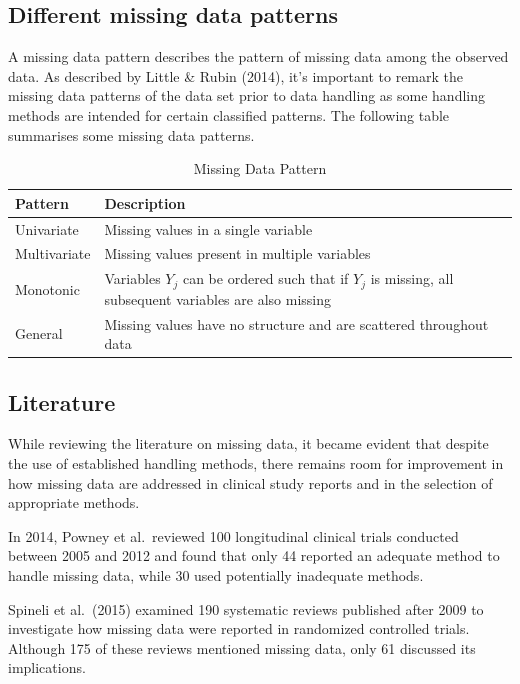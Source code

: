 \documentclass{article}
\begin{document}
\subsection{Different missing data
patterns}\label{different-missing-data-patterns}

A missing data pattern describes the pattern of missing data among the
observed data. As described by Little \& Rubin (2014), it's important to
remark the missing data patterns of the data set prior to data handling
as some handling methods are intended for certain classified patterns.
The following table summarises some missing data patterns.

\begin{table}[H]
\centering
\caption{Missing Data Pattern}
\label{}

\begin{tabular}{ll}
\toprule
Pattern & Description\\
\midrule
Univariate & Missing values in a single variable\\
Multivariate & Missing values present in multiple variables\\
Monotonic & Variables $Y_j$ can be ordered such that if $Y_j$ is missing, all subsequent variables are also missing\\
General & Missing values have no structure and are scattered throughout data\\
\bottomrule
\end{tabular}
\end{table}

\subsection{Literature}\label{literature}

While reviewing the literature on missing data, it became evident that
despite the use of established handling methods, there remains room for
improvement in how missing data are addressed in clinical study reports
and in the selection of appropriate methods.

In 2014, Powney et al.~reviewed 100 longitudinal clinical trials
conducted between 2005 and 2012 and found that only 44 reported an
adequate method to handle missing data, while 30 used potentially
inadequate methods.

Spineli et al.~(2015) examined 190 systematic reviews published after
2009 to investigate how missing data were reported in randomized
controlled trials. Although 175 of these reviews mentioned missing data,
only 61 discussed its implications.
\end{document}
